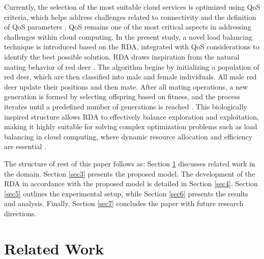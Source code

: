 \documentclass[pdflatex,sn-mathphys-num]{sn-jnl}%
\theoremstyle{thmstyleone}%
\theoremstyle{thmstyletwo}%
\theoremstyle{thmstylethree}%
\begin{document}
Currently, the selection of the most suitable cloud services is optimized using QoS criteria, which helps address challenges related to connectivity and the definition of QoS parameters \cite{QoS}. QoS remains one of the most critical aspects in addressing challenges within cloud computing. In the present study, a novel load balancing technique is introduced based on the RDA, integrated with QoS considerations to identify the best possible solution. RDA draws inspiration from the natural mating behavior of red deer \cite{red_deer}. The algorithm begins by initializing a population of red deer, which are then classified into male and female individuals. All male red deer update their positions and then mate. After all mating operations, a new generation is formed by selecting offspring based on fitness, and the process iterates until a predefined number of generations is reached \cite{red_deer}. This biologically inspired structure allows RDA to effectively balance exploration and exploitation, making it highly suitable for solving complex optimization problems such as load balancing in cloud computing, where dynamic resource allocation and efficiency are essential \cite{red_deer_Pradhan2022}.

The structure of rest of this paper follows as: Section \ref{sec2} discusses related work in the domain. Section \ref{sec3} presents the proposed model. The development of the RDA in accordance with the proposed model is detailed in Section \ref{sec4}. Section \ref{sec5} outlines the experimental setup, while Section \ref{sec6} presents the results and analysis. Finally, Section \ref{sec7} concludes the paper with future research directions.


\section{Related Work}\label{sec2}
\end{document}
